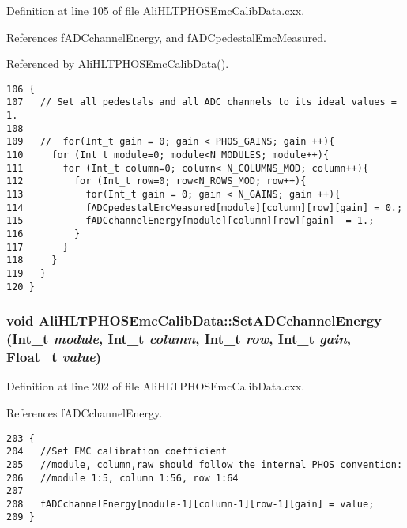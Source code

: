 Definition at line 105 of file Ali\-HLTPHOSEmc\-Calib\-Data.cxx.

References f\-ADCchannel\-Energy, and f\-ADCpedestal\-Emc\-Measured.

Referenced by Ali\-HLTPHOSEmc\-Calib\-Data().

\footnotesize\begin{verbatim}106 {
107   // Set all pedestals and all ADC channels to its ideal values = 1.
108 
109   //  for(Int_t gain = 0; gain < PHOS_GAINS; gain ++){
110     for (Int_t module=0; module<N_MODULES; module++){
111       for (Int_t column=0; column< N_COLUMNS_MOD; column++){
112         for (Int_t row=0; row<N_ROWS_MOD; row++){
113           for(Int_t gain = 0; gain < N_GAINS; gain ++){
114           fADCpedestalEmcMeasured[module][column][row][gain] = 0.;
115           fADCchannelEnergy[module][column][row][gain]  = 1.;
116         }
117       }
118     }
119   }
120 }
\end{verbatim}\normalsize 


\subsubsection{\setlength{\rightskip}{0pt plus 5cm}void Ali\-HLTPHOSEmc\-Calib\-Data::Set\-ADCchannel\-Energy (Int\_\-t {\em module}, Int\_\-t {\em column}, Int\_\-t {\em row}, Int\_\-t {\em gain}, Float\_\-t {\em value})}\label{classAliHLTPHOSEmcCalibData_AliHLTPHOSEmcCalibDataa9}




Definition at line 202 of file Ali\-HLTPHOSEmc\-Calib\-Data.cxx.

References f\-ADCchannel\-Energy.

\footnotesize\begin{verbatim}203 {
204   //Set EMC calibration coefficient
205   //module, column,raw should follow the internal PHOS convention:
206   //module 1:5, column 1:56, row 1:64
207 
208   fADCchannelEnergy[module-1][column-1][row-1][gain] = value;
209 }
\end{verbatim}\normalsize 


